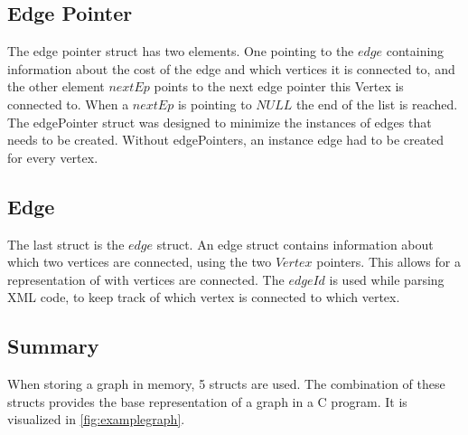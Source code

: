 \begin{minipage}{\linewidth}
\subsection{Edge Pointer}

The edge pointer struct has two elements. One pointing to the $edge$ containing information about the cost of the edge and which vertices it is connected to, and the other element $nextEp$ points to the next edge pointer this Vertex is connected to. When a $nextEp$ is pointing to $NULL$ the end of the list is reached. The edgePointer struct was designed to minimize the instances of edges that needs to be created. Without edgePointers, an instance edge had to be created for every vertex.


 \label{ep_struct}

\end{minipage}


\begin{minipage}{\linewidth}
\subsection{Edge}
The last struct is the $edge$ struct. An edge struct contains information about which two vertices are connected, using the two $Vertex$ pointers. This allows for a representation of with vertices are connected. The $edgeId$ is used while parsing XML code, to keep track of which vertex is connected to which vertex.

 \label{edge_struct}
\end{minipage}

\subsection{Summary}
When storing a graph in memory, 5 structs are used. The combination of these structs provides the base representation of a graph in a C program. It is visualized in \cref{fig:examplegraph}.


